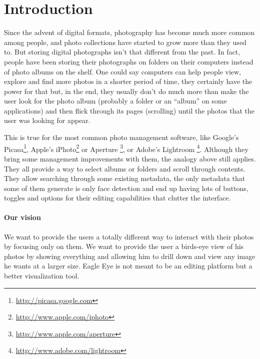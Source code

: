 \chapter{Introduction} %
\label{chapter:introduction}



Since the advent of digital formats, photography has become much more common among people, and photo collections have started to grow more than they used to. But storing digital photographs isn't that different from the past. In fact, people have been storing their photographs on folders on their computers instead of photo albums on the shelf. One could say computers can help people view, explore and find more photos in a shorter period of time, they certainly have the power for that but, in the end, they usually don't do much more than make the user look for the photo album (probably a folder or an ``album'' on some applications) and then flick through its pages (scrolling) until the photos that the user was looking for appear.

This is true for the most common photo management software, like Google's Picasa\footnote{\url{http://picasa.google.com}}, Apple's iPhoto\footnote{\url{http://www.apple.com/iphoto}} or Aperture \footnote{\url{http://www.apple.com/aperture}}, or Adobe's Lightroom \footnote{\url{http://www.adobe.com/lightroom}}. Although they bring some management improvements with them, the analogy above still applies. They all provide a way to select albums or folders and scroll through contents. They allow searching through some existing metadata, the only metadata that some of them generate is only face detection and end up having lots of buttons, toggles and options for their editing capabilities that clutter the interface.

\subsubsection{Our vision} %
\label{ssub:our_vision}


We want to provide the users a totally different way to interact with their photos by focusing only on them. We want to provide the user a birds-eye view of his photos by showing everything and allowing him to drill down and view any image he wants at a larger size. Eagle Eye is not meant to be an editing platform but a better visualization tool.

